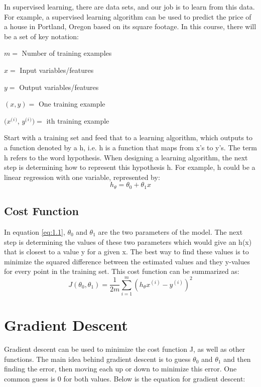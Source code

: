 In supervised learning, there are data sets, and our job is to learn from this data. For example, a supervised learning algorithm can be used to predict the price of a house in Portland, Oregon based on its square footage. In this course, there will be a set of key notation:
	
	$m = $ Number of training examples

	$x = $ Input variables/features

	$y = $ Output variables/features

	$(x, y) = $ One training example

	$(x^($$^i$$^)$, $y^($$^i$$^)) = $ ith training example

Start with a training set and feed that to a learning algorithm, which outputs to a function denoted by a h, i.e. h is a function that maps from x's to y's. The term h refers to the word hypothesis. When designing a learning algorithm, the next step is determining how to represent this hypothesis h. For example, h could be a linear regression with one variable, represented by:
\begin{equation}
	h_\theta = \theta_0 + \theta_1x
	\label{eq:1.1}
\end{equation}

\subsection{Cost Function}

In equation \ref{eq:1.1}, $\theta_0$ and $\theta_1$ are the two parameters of the model. The next step is determining the values of these two parameters which would give an h(x) that is closest to a value y for a given x. The best way to find these values is to minimize the squared difference between the estimated values and they y-values for every point in the training set. This cost function can be summarized as:
\begin{equation}
	J(\theta_0, \theta_1) = \frac{1}{2m}\sum_{i=1}^{m}(h_{\theta}x^{(i)} - y^{(i)})^2
	\label{eq:1.2}
\end{equation}

\section{Gradient Descent}

Gradient descent can be used to minimize the cost function J, as well as other functions. The main idea behind gradient descent is to guess $\theta_0$ and $\theta_1$ and then finding the error, then moving each up or down to minimize this error. One common guess is 0 for both values. Below is the equation for gradient descent:

